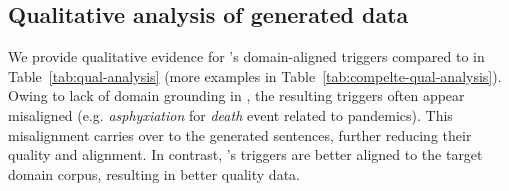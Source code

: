 
\subsection{Qualitative analysis of generated data}
\label{sec:qual-analysis}

We provide qualitative evidence for \modelName's domain-aligned triggers compared to \starName{} in Table~\ref{tab:qual-analysis} (more examples in Table~\ref{tab:compelte-qual-analysis}).
Owing to lack of domain grounding in \starName{}, the resulting triggers often appear misaligned (e.g. \emph{asphyxiation} for \textit{death} event related to pandemics).
This misalignment carries over to the generated sentences, further reducing their quality and alignment.
In contrast, \modelName's triggers are better aligned to the target domain corpus, resulting in better quality data.



